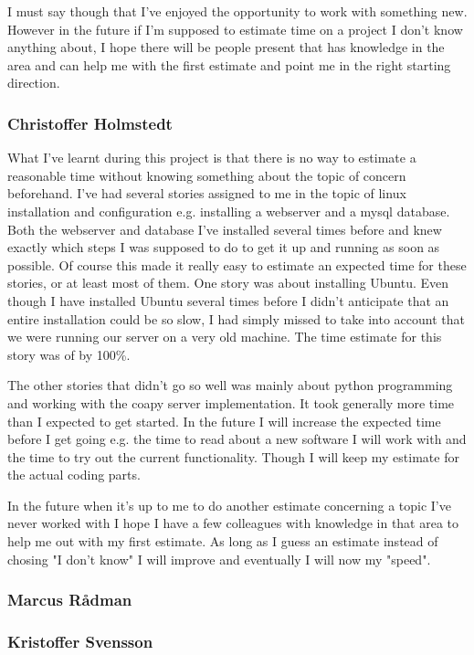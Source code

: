 I must say though that I've enjoyed the opportunity to work with something new. However in the future if I'm supposed to estimate time on a project I don't know anything about, I hope 
there will be people present that has knowledge in the area and can help me with the first estimate and point me in the right starting direction.

\subsubsection{Christoffer Holmstedt}
What I've learnt during this project is that there is no way to estimate a reasonable time without knowing something about the topic of concern beforehand.
I've had several stories assigned to me in the topic of linux installation and configuration e.g. installing a webserver and a mysql database.
Both the webserver and database I've installed several times before and knew exactly which steps I was supposed to do to get it up and running as soon as possible.
Of course this made it really easy to estimate an expected time for these stories, or at least most of them.
One story was about installing Ubuntu.
Even though I have installed Ubuntu several times before I didn't anticipate that an entire installation could be so slow, I had simply missed to take into account that we were running our server on a very old machine.
The time estimate for this story was of by 100\%.

The other stories that didn't go so well was mainly about python programming and working with the coapy server implementation. 
It took generally more time than I expected to get started.
In the future I will increase the expected time before I get going e.g. the time to read about a new software I will work with and the time to try out the current functionality.
Though I will keep my estimate for the actual coding parts.

In the future when it's up to me to do another estimate concerning a topic I've never worked with I hope I have a few colleagues with knowledge in that area to help me out with my first estimate.
As long as I guess an estimate instead of chosing "I don't know" I will improve and eventually I will now my "speed".

\subsubsection{Marcus Rådman}
\subsubsection{Kristoffer Svensson}
